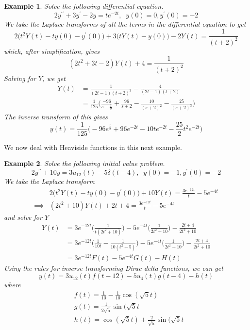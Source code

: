 \documentclass{article}
\newtheorem{example}{Example}[section]
\theoremstyle{remark}
\theoremstyle{definition}
\begin{document}
    \begin{example}
    Solve the following differential equation. 
    \[2 y^{\prime\prime} + 3 y^\prime - 2y = t e^{-2t}, \;\; y(0) = 0, y^\prime (0) = -2\]
    We take the Laplace transforms of all the terms in the differential equation to get
    \[2\big( t^2 Y(t) - t y(0) - y^\prime (0)\big) + 3 \big( t Y(t) - y(0)\big) - 2 Y(t) = \frac{1}{(t+2)^2}\]
    which, after simplification, gives
    \[(2t^2 + 3t - 2) Y(t) + 4 = \frac{1}{(t+2)^2}\]
    Solving for $Y$, we get
    \begin{align*}
        Y(t) & = \frac{1}{(2t-1)(t+2)^3} - \frac{4}{(2t-1)(t+2)} \\
        & = \frac{1}{125} \bigg(\frac{-96}{s-\frac{1}{2}} + \frac{96}{s+2} - \frac{10}{(s+2)^2} - \frac{25}{(s+2)^3} \bigg)
    \end{align*}
    The inverse transform of this gives 
    \[y(t) = \frac{1}{125} \Big( -96 e^{\frac{t}{2}} + 96 e^{-2t} - 10t e^{-2t} - \frac{25}{2} t^2 e^{-2t}\Big) \]
    \end{example}

    We now deal with Heaviside functions in this next example. 
    \begin{example}
    Solve the following initial value problem. 
    \[2 y^{\prime\prime} + 10 y = 3 u_{12} (t) - 5 \delta(t - 4), \;\; y(0) = -1, y^\prime (0) = -2\]
    We take the Laplace transform 
    \begin{align*}
        & 2 \big( t^2 Y(t) - t y(0) - y^\prime (0) \big) + 10 Y(t) = \frac{3 e^{-12t}}{t} - 5 e^{-4 t} \\
        \implies & (2 t^2 + 10) Y(t) + 2t + 4 = \frac{3 e^{-12t}}{t} - 5 e^{-4t}
    \end{align*}
    and solve for $Y$
    \begin{align*}
        Y(t) & = 3 e^{-12t} \bigg(\frac{1}{t (2t^2 + 10)} \bigg) - 5e^{-4t} \bigg(\frac{1}{2t^2 + 10} \bigg) - \frac{2t+4}{2t^2 + 10} \\
        & = 3 e^{-12t} \bigg(\frac{1}{10t} - \frac{1}{10(t^2+5)} \bigg) - 5e^{-4t} \bigg(\frac{1}{2t^2 + 10} \bigg) - \frac{2t+4}{2t^2 + 10} \\
        & = 3 e^{-12t} F(t) - 5 e^{-4t} G(t) - H(t)
    \end{align*}
    Using the rules for inverse transforming Dirac delta functions, we can get
    \[y (t) = 3 u_{12} (t) f(t-12) - 5 u_4 (t) g(t-4) - h(t)\]
    where 
    \begin{align*}
        & f(t) = \frac{1}{10} - \frac{1}{10} \cos{(\sqrt{5} t)} \\
        & g(t) = \frac{1}{2 \sqrt{5}} \sin{(\sqrt{5}t} \\
        & h(t) = \cos{(\sqrt{5}t)} + \frac{2}{\sqrt{5}} \sin{(\sqrt{5}t}
    \end{align*}
    \end{example}
\end{document}
